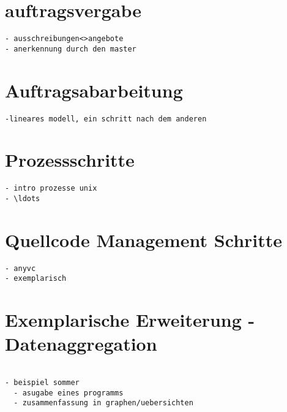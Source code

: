 \section{auftragsvergabe}

\begin{verbatim}
- ausschreibungen<>angebote
- anerkennung durch den master

\end{verbatim}

\section{Auftragsabarbeitung}
\begin{verbatim}
-lineares modell, ein schritt nach dem anderen
\end{verbatim}

\section{Prozessschritte}

\begin{verbatim}
- intro prozesse unix
- \ldots
\end{verbatim}

\section{Quellcode Management Schritte}


\begin{verbatim}
- anyvc
- exemplarisch
\end{verbatim}

\section{Exemplarische Erweiterung - Datenaggregation}

\begin{verbatim}

- beispiel sommer
  - asugabe eines programms
  - zusammenfassung in graphen/uebersichten

\end{verbatim}

